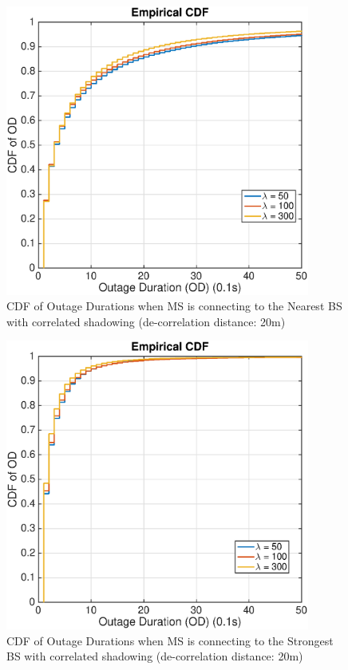   \begin{figure}
 \centering
 \includegraphics[width=10cm]{ODthresh-5DeCorr20NBMode2.eps}
 \caption{CDF of Outage Durations when MS is connecting to the Nearest BS with correlated shadowing (de-correlation distance: 20m)}
 \label{corr201}
 \end{figure}
 \begin{figure}
 \centering
 \includegraphics[width=10cm]{ODthresh-5DeCorr20MaxMode2.eps}
 \caption{CDF of Outage Durations when MS is connecting to the Strongest BS with correlated shadowing (de-correlation distance: 20m)}
 \label{corr202}
 \end{figure}
 
